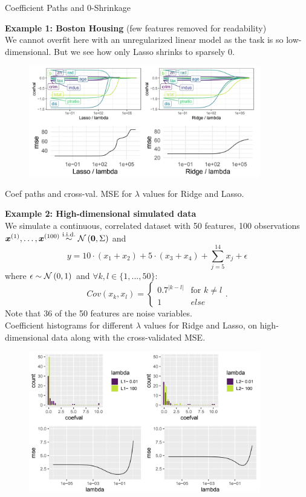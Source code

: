 \begin{vbframe}{Coefficient Paths and 0-Shrinkage}

\textbf{Example 1: Boston Housing} (few features removed for readability) \\

We cannot overfit here with an unregularized linear model as the task is so low-dimensional. But we see how only Lasso shrinks to sparsely 0.

\begin{figure}
\includegraphics[width=0.9\textwidth]{figure_man/0shrinkage-01.png}\\
\end{figure}

Coef paths and cross-val. MSE for $\lambda$ values for Ridge and Lasso.

\framebreak
\textbf{Example 2: High-dimensional simulated data} \\
We simulate a continuous, correlated dataset with 50 features, 100 observations $\bm{x}^{(1)},\dots, \bm{x}^{(100)} \overset{\text{i.i.d.}}{\sim} \mathcal{N} \left(\mathbf{0}, \Sigma \right)$ and 
$$ y = 10 \cdot (x_1 + x_2) + 5 \cdot (x_3 + x_4) + \sum_{j = 5}^{14} x_j + \epsilon $$
where $\epsilon \sim \mathcal{N} \left(0, 1\right)$ and $ \forall k, l \in \{1, ..., 50\}$: 
$$Cov(x_k, x_l) = 
  \begin{cases}
   0.7^{|k-l|} & \text{for } k \neq l \\
   1 & else 
   \end{cases}. 
$$ 
Note that 36 of the 50 features are noise variables. \\
\framebreak 
Coefficient histograms for different $\lambda$ values for Ridge and Lasso, on high-dimensional data along with the cross-validated MSE.

\begin{figure}
\includegraphics[width=0.9\textwidth]{figure_man/0shrinkage-02.png}\\
\end{figure}


\end{vbframe}
